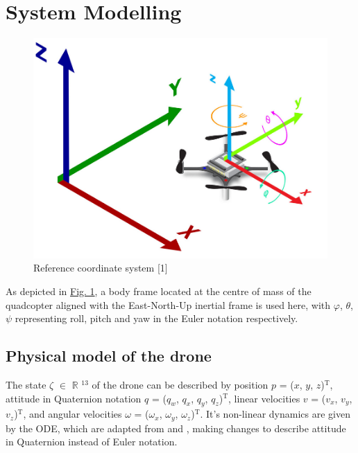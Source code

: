 \documentclass[conference]{IEEEtran}
\begin{document}
\section{System Modelling}\label{Section2}
\begin{figure}[htbp]
	\centerline{\includegraphics[scale = 0.4]{figures/ordinate.png} }
	\caption{Reference coordinate system [1]}
	\label{Fig1}
\end{figure}
As depicted in \hyperref[Fig1]{Fig. 1}, a body frame located at the centre of mass of the quadcopter aligned with the East-North-Up inertial frame is used here, with $\varphi$, $\theta$, $\psi$ representing roll, pitch and yaw in the Euler notation respectively.

\subsection{Physical model of the drone}
The state $\zeta$ $\in$ $\mathbb{R}$ $\mathrm{^{13}}$ of the drone can be described by position $p$ = ($x$, $y$, $z$)$\mathrm{^{T}}$, attitude in Quaternion notation $q$ = ($q_{w}$, $q_{x}$, $q_{y}$, $q_{z}$)$\mathrm{^{T}}$, linear velocities $v$ = ($v_x$, $v_y$, $v_z$)$\mathrm{^{T}}$, and angular velocities $\omega$ = ($\omega_x$, $\omega_y$, $\omega_z$)$\mathrm{^{T}}$. It's non-linear dynamics are given by the ODE, which are adapted from \cite{carlos_efficient_2020} and \cite{Luis_2016}, making changes to describe attitude in Quaternion instead of Euler notation.\\
\end{document}
